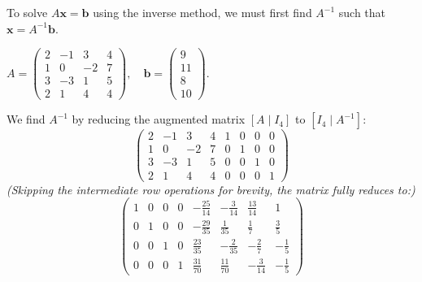 \documentclass[12pt,a3paper]{article}
\begin{document}
\begin{tcolorbox}[enhanced,breakable,
  colback=cB!4,colframe=cB,boxrule=0.8pt,arc=5pt,
  title={\textbf{Answer --- Solve $4\times4$ System via Inverse of Coefficient Matrix}},
  fonttitle=\bfseries\color{white},colbacktitle=cB]

To solve $A\mathbf{x} = \mathbf{b}$ using the inverse method, we must first find $A^{-1}$ such that $\mathbf{x} = A^{-1}\mathbf{b}$.

$A=\begin{pmatrix}2&-1&3&4\\1&0&-2&7\\3&-3&1&5\\2&1&4&4\end{pmatrix},\quad \mathbf{b}=\begin{pmatrix}9\\11\\8\\10\end{pmatrix}$.

We find $A^{-1}$ by reducing the augmented matrix $[A \mid I_4]$ to $[I_4 \mid A^{-1}]$:
\[
\left(\begin{array}{cccc|cccc}
2&-1&3&4&1&0&0&0\\
1&0&-2&7&0&1&0&0\\
3&-3&1&5&0&0&1&0\\
2&1&4&4&0&0&0&1
\end{array}\right)
\]
\textit{(Skipping the intermediate row operations for brevity, the matrix fully reduces to:)}
\[
\left(\begin{array}{cccc|cccc}
1&0&0&0&-\frac{25}{14}&-\frac{3}{14}&\frac{13}{14}&1\\[6pt]
0&1&0&0&-\frac{29}{35}&\frac{1}{35}&\frac{1}{7}&\frac{3}{5}\\[6pt]
0&0&1&0&\frac{23}{35}&-\frac{2}{35}&-\frac{2}{7}&-\frac{1}{5}\\[6pt]
0&0&0&1&\frac{31}{70}&\frac{11}{70}&-\frac{3}{14}&-\frac{1}{5}
\end{array}\right)
\]


\end{tcolorbox}
\end{document}
